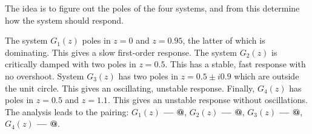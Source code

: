 \documentclass[letterpaper,12pt]{scrartcl}
\makeatletter
\newenvironment{exercise}[1][Problem]{\begin{trivlist} \item[\hskip
    \labelsep {\stepcounter{exerctr}\bfseries #1
      \arabic{exerctr}}]}{\end{trivlist}\vspace{10mm}}
\newcounter{exerctr}
\newcommand*{\rom}[1]{\expandafter\@slowromancap\romannumeral #1@}
\makeatother
\begin{document}
\begin{exercise}

The idea is to figure out the poles of the four systems, and from this determine how the system should respond.

The system $G_1(z)$ poles in $z=0$ and $z=0.95$, the latter of which is dominating. This gives a slow first-order response. The system $G_2(z)$ is critically damped with two poles in $z=0.5$. This has a stable, fast response with no overshoot. System $G_3(z)$ has two poles in $z = 0.5 \pm i0.9$ which are outside the unit circle. This gives an oscillating, unstable response. Finally, $G_4(z)$ has poles in $z=0.5$ and $z=1.1$. This gives an unstable response without oscillations. The analysis leads to the pairing: \textbf{$G_1(z)$ --- \rom{1}},  \textbf{$G_2(z)$ --- \rom{3}},  \textbf{$G_3(z)$ --- \rom{4}},  \textbf{$G_4(z)$ --- \rom{2}}. 
\end{exercise}
\end{document}
